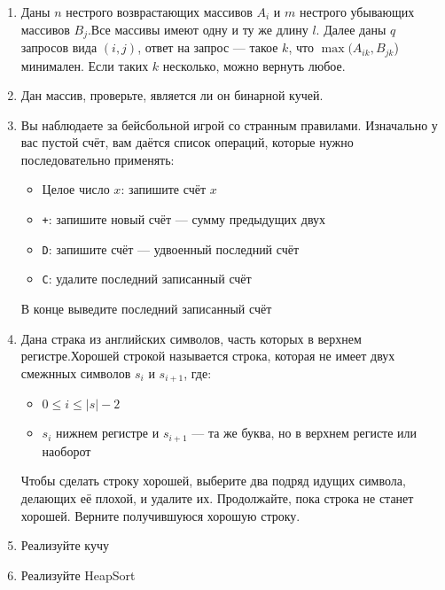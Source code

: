 \documentclass[a4paper, 12pt]{article}
\begin{document}
\begin{enumerate}
        \item Даны $n$ нестрого возврастающих массивов $A_i$ и $m$ нестрого убывающих массивов $B_j$.Все массивы имеют одну и ту же длину $l$. Далее даны $q$ запросов вида $(i,j)$, ответ на запрос --- такое $k$, что $\max(A_{ik},B_{jk}$) минимален. Если таких $k$ несколько, можно вернуть любое.
        \item Дан массив, проверьте, является ли он бинарной кучей.
        \item Вы наблюдаете за бейсбольной игрой со странным правилами. Изначально у вас пустой счёт, вам даётся список операций, которые нужно последовательно применять:
        \begin{itemize}
            \item Целое число $x$: запишите счёт $x$
            \item \verb|+|: запишите новый счёт --- сумму предыдущих двух
            \item \verb|D|: запишите счёт --- удвоенный последний счёт
            \item \verb|C|: удалите последний записанный счёт
        \end{itemize}
        В конце выведите последний записанный счёт
        \item Дана страка из английских символов, часть которых в верхнем регистре.Хорошей строкой называется строка, которая не имеет двух смежнных символов $s_i$ и $s_{i+1}$, где:
        \begin{itemize}
            \item $0\leq i\leq |s| - 2$
            \item $s_i$  нижнем регистре и $s_{i+1}$ --- та же буква, но в верхнем регисте или наоборот
        \end{itemize}
        Чтобы сделать строку хорошей, выберите два подряд идущих символа, делающих её плохой, и удалите их. Продолжайте, пока строка не станет хорошей.
        Верните получившуюся хорошую строку.
        \item Реализуйте кучу
        \item Реализуйте HeapSort
    \end{enumerate}
\end{document}

